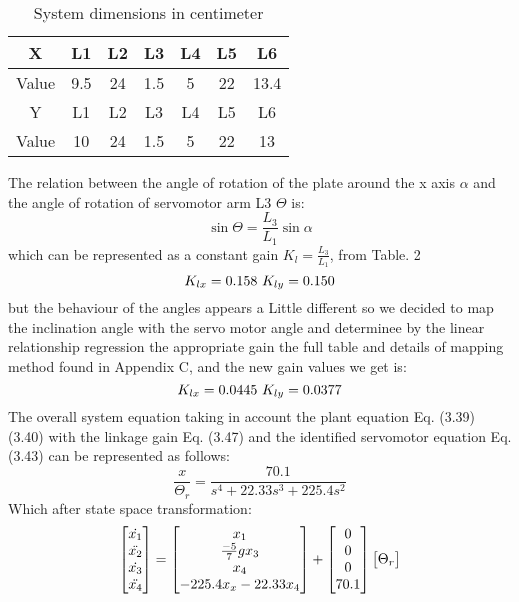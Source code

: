 \begin{table}[h]
  \centering
  \caption{System dimensions in centimeter}
  \begin{tabular}{|c|c c c c c c|}
    \hline
    \hline
     X & L1 & L2 & L3 & L4 & L5 & L6 \\
    \hline
    Value & 9.5 & 24 & 1.5 & 5 & 22 & 13.4 \\
    \hline
    \hline
     Y & L1 & L2 & L3 & L4 & L5 & L6 \\
    \hline
    Value & 10 & 24 & 1.5 & 5 & 22 & 13 \\
    \hline
  \end{tabular}
\end{table}
The relation between the angle of rotation of the plate around the x axis \(\alpha\) and the angle of rotation of servomotor arm L3 \(\Theta\) is:
\begin{equation}
\sin{\Theta} = \frac{L_3}{L_1}\sin{\alpha}
\end{equation}
which can be represented as a constant gain \(K_l= \frac{L_3}{L_1}\), from Table. 2
\begin{equation}
K_{lx} = 0.158 \\\
K_{ly} = 0.150
\end{equation}
but the behaviour of the angles appears a Little different so we decided to map the inclination angle with the servo motor angle and determinee by the linear relationship regression the appropriate gain
the full table and details of mapping method found in Appendix C, and the new gain values we get is:
\begin{equation}
K_{lx} = 0.0445 \\\
K_{ly} = 0.0377
\end{equation}
The overall system equation taking in account the plant equation Eq. (3.39) (3.40) with the linkage gain Eq. (3.47) and the identified servomotor equation Eq. (3.43) can be represented as follows:
\begin{equation}
\frac{x}{\Theta_r}=\frac{70.1}{s^4+22.33s^3+225.4s^2}
\end{equation}
Which after state space transformation:
\begin{equation}
\begin{bmatrix}
\Dot{x_1}\\
\Ddot{x_2}\\
\Dot{x_3}\\
\Ddot{x_4}\\
\end{bmatrix}
=
\begin{bmatrix}
x_1\\
\frac{-5}{7}gx_3\\
x_4\\
-225.4x_x -22.33x_4\\
\end{bmatrix}
+ 
\begin{bmatrix}
0  \\
0 \\
0 \\
70.1
\end{bmatrix}
\begin{bmatrix}
\Theta_r  \\
\end{bmatrix}
\end{equation}
